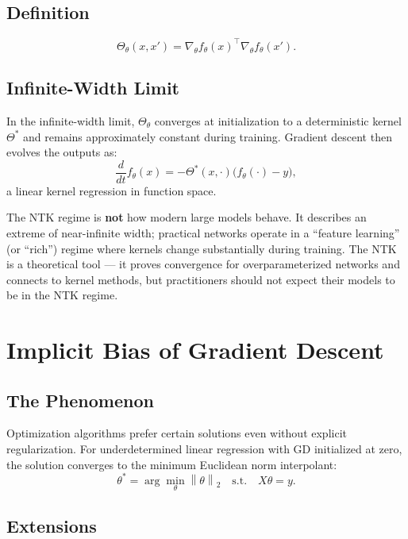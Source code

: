 \documentclass[12pt,a4paper]{article}
\theoremstyle{definition}
\theoremstyle{remark}
\newcommand{\norm}[1]{\left\lVert #1 \right\rVert}
\begin{document}
\subsection{Definition}

\[
\Theta_\theta(x, x') = \nabla_\theta f_\theta(x)^\top \nabla_\theta f_\theta(x').
\]

\subsection{Infinite-Width Limit}

In the infinite-width limit, $\Theta_\theta$ converges at initialization to a deterministic kernel $\Theta^*$ and remains approximately constant during training. Gradient descent then evolves the outputs as:
\[
\frac{d}{dt}f_\theta(x) = -\Theta^*(x,\cdot)\bigl(f_\theta(\cdot) - y\bigr),
\]
a linear kernel regression in function space.

\begin{critbox}
The NTK regime is \textbf{not} how modern large models behave. It describes an extreme of near-infinite width; practical networks operate in a ``feature learning'' (or ``rich'') regime where kernels change substantially during training. The NTK is a theoretical tool — it proves convergence for overparameterized networks and connects to kernel methods, but practitioners should not expect their models to be in the NTK regime.
\end{critbox}

\section{Implicit Bias of Gradient Descent}

\subsection{The Phenomenon}

Optimization algorithms prefer certain solutions even without explicit regularization. For underdetermined linear regression with GD initialized at zero, the solution converges to the minimum Euclidean norm interpolant:
\[
\theta^* = \arg\min_\theta \norm{\theta}_2 \quad \text{s.t.} \quad X\theta = y.
\]

\subsection{Extensions}
\end{document}

